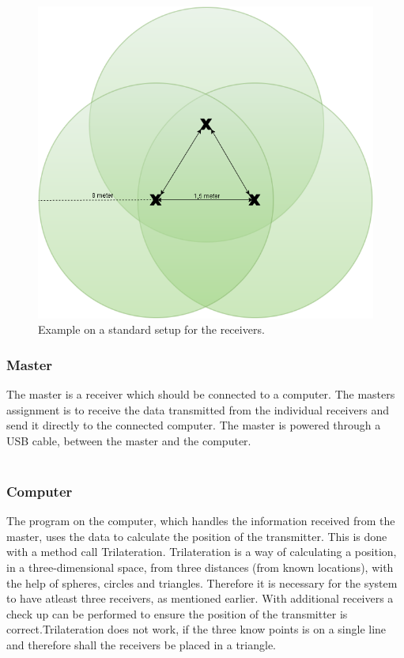 \begin{figure}[H]
	\centering
	\includegraphics[scale=0.5]{figures/ReceiverSetup.png}
	\caption{Example on a standard setup for the receivers. }
	\label{receiverSetup}
	\flushleft
\end{figure}

\subsubsection{Master}
The master is a receiver which should be connected to a computer. The masters assignment is to receive the data transmitted from the individual receivers and send it directly to the connected computer. The master is powered through a USB cable, between the master and the computer.\\\\

\subsubsection{Computer}
The program on the computer, which handles the information received from the master, uses the data to calculate the position of the transmitter. This is done with a method call Trilateration. Trilateration is a way of calculating a position, in a three-dimensional space, from three distances (from known locations), with the help of spheres, circles and triangles. Therefore it is necessary for the system to have atleast three receivers, as mentioned earlier.  With additional receivers a check up can be performed to ensure the position of the transmitter is correct.Trilateration does not work, if the three know points is on a single line and therefore shall the receivers be placed in a triangle.\\\\

